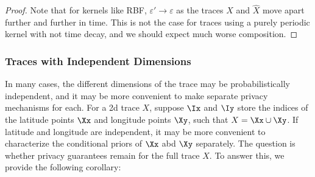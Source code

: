 \begin{proof}
Note that for kernels like RBF, $\varepsilon' \rightarrow \varepsilon$ as the traces $X$ and $\hat{X}$ move apart further and further in time. This is not the case for traces using a purely periodic kernel with not time decay, and we should expect much worse composition. 
\end{proof}


\subsubsection{Traces with Independent Dimensions}
In many cases, the different dimensions of the trace may be probabilistically independent, and it may be more convenient to make separate privacy mechanisms for each. For a 2d trace $X$, suppose $\Ix$ and $\Iy$ store the indices of the latitude points $\Xx$ and longitude points $\Xy$, such that $X = \Xx \cup \Xy$. If latitude and longitude are independent, it may be more convenient to characterize the conditional priors of $\Xx$ abd $\Xy$ separately. The question is whether privacy guarantees remain for the full trace $X$. To answer this, we provide the following corollary: 

